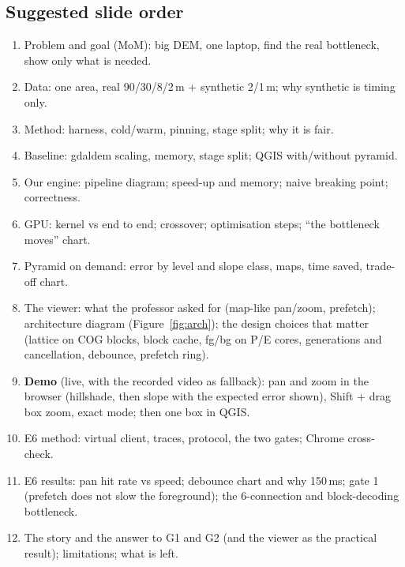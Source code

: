 ﻿\documentclass[11pt,a4paper]{article}
\begin{document}
\subsection{Suggested slide order}
\begin{enumerate}
  \item Problem and goal (MoM): big DEM, one laptop, find the real bottleneck, show only what is needed.
  \item Data: one area, real 90/30/8/2\,m + synthetic 2/1\,m; why synthetic is timing only.
  \item Method: harness, cold/warm, pinning, stage split; why it is fair.
  \item Baseline: gdaldem scaling, memory, stage split; QGIS with/without pyramid.
  \item Our engine: pipeline diagram; speed-up and memory; naive breaking point; correctness.
  \item GPU: kernel vs end to end; crossover; optimisation steps; ``the bottleneck moves'' chart.
  \item Pyramid on demand: error by level and slope class, maps, time saved, trade-off chart.
  \item The viewer: what the professor asked for (map-like pan/zoom, prefetch); architecture diagram
  (Figure~\ref{fig:arch}); the design choices that matter (lattice on COG blocks, block cache, fg/bg on P/E cores,
  generations and cancellation, debounce, prefetch ring).
  \item \textbf{Demo} (live, with the recorded video as fallback): pan and zoom in the browser (hillshade, then slope with
  the expected error shown), Shift + drag box zoom, exact mode; then one box in QGIS.
  \item E6 method: virtual client, traces, protocol, the two gates; Chrome cross-check.
  \item E6 results: pan hit rate vs speed; debounce chart and why 150\,ms; gate 1 (prefetch does not slow the
  foreground); the 6-connection and block-decoding bottleneck.
  \item The story and the answer to G1 and G2 (and the viewer as the practical result); limitations; what is left.
\end{enumerate}
\end{document}

